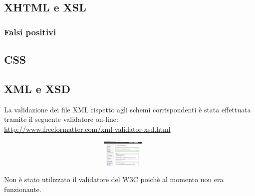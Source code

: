 \subsection{XHTML e XSL}
	\subsubsection {Falsi positivi}
\subsection{CSS}

\subsection{XML e XSD}
La validazione dei file XML rispetto agli schemi corrispondenti \`e stata effettuata tramite il seguente validatore on-line:
\\
\href{http://www.freeformatter.com/xml-validator-xsd.html}{http://www.freeformatter.com/xml-validator-xsd.html}
\begin{figure}[htbp]
	\centering
	\includegraphics[width=105mm, height=13mm]{images/validazioneArticoli.png}
\end{figure}
Non è stato utilizzato il validatore del W3C poich\`e al momento non era funzionante.
